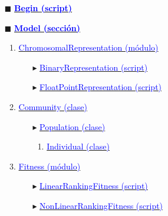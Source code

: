 \documentclass[12pt,twoside]{article}
\begin{document}
\begin{itemize}
\item[$\blacksquare$] \hyperref[sec:a_1]{\textbf{\textcolor{blue}{\large Begin (script)}}} 
\item[$\blacksquare$] \hyperref[sec:a_2]{\textbf{\textcolor{blue}{\large Model (sección)}}} 
      \begin{enumerate}[$\square$]
      \item \hyperref[sec:a_2_1]{\textcolor{blue}{ChromosomalRepresentation (módulo)}} 
            \begin{itemize}
            \item[$\blacktriangleright$] \hyperref[sec:a_2_1_1]{\textcolor{blue}{BinaryRepresentation (script)}} 
            \item[$\blacktriangleright$] \hyperref[sec:a_2_1_2]{\textcolor{blue}{FloatPointRepresentation (script)}}
            \end{itemize}
      \item \hyperref[sec:a_2_2]{\textcolor{blue}{Community (clase)}}
            \begin{itemize}
            \item[$\blacktriangleright$] \hyperref[sec:a_2_2_1]{\textcolor{blue}{Population (clase)}}
                  \begin{enumerate}[$\triangleright$]
                  \item \hyperref[sec:a_2_2_1_1]{\textcolor{blue}{Individual (clase)}}
                  \end{enumerate}
            \end{itemize}
      \item \hyperref[sec:a_2_3]{\textcolor{blue}{Fitness (módulo)}}
            \begin{itemize}
            \item[$\blacktriangleright$] \hyperref[sec:a_2_3_1]{\textcolor{blue}{LinearRankingFitness (script)}}
            \item[$\blacktriangleright$] \hyperref[sec:a_2_3_2]{\textcolor{blue}{NonLinearRankingFitness (script)}}

\end{itemize}
\end{enumerate}
\end{itemize}
\end{document}
